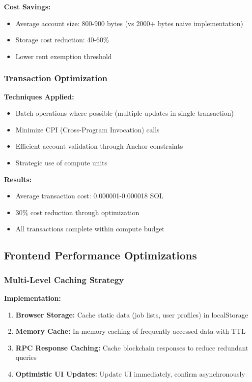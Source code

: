 \documentclass[a4paper,13pt,twoside]{report}
\theoremstyle{definition}
\begin{document}
\textbf{Cost Savings:}
\begin{itemize}
    \item Average account size: 800-900 bytes (vs 2000+ bytes naive implementation)
    \item Storage cost reduction: 40-60\%
    \item Lower rent exemption threshold
\end{itemize}

\subsubsection{Transaction Optimization}

\textbf{Techniques Applied:}
\begin{itemize}
    \item Batch operations where possible (multiple updates in single transaction)
    \item Minimize CPI (Cross-Program Invocation) calls
    \item Efficient account validation through Anchor constraints
    \item Strategic use of compute units
\end{itemize}

\textbf{Results:}
\begin{itemize}
    \item Average transaction cost: 0.000001-0.000018 SOL
    \item 30\% cost reduction through optimization
    \item All transactions complete within compute budget
\end{itemize}

\subsection{Frontend Performance Optimizations}

\subsubsection{Multi-Level Caching Strategy}

\textbf{Implementation:}
\begin{enumerate}
    \item \textbf{Browser Storage:} Cache static data (job lists, user profiles) in localStorage

    \item \textbf{Memory Cache:} In-memory caching of frequently accessed data with TTL

    \item \textbf{RPC Response Caching:} Cache blockchain responses to reduce redundant queries

    \item \textbf{Optimistic UI Updates:} Update UI immediately, confirm asynchronously
\end{enumerate}
\end{document}

